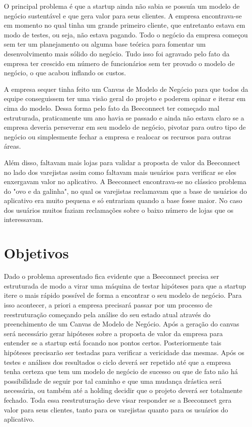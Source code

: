 O principal problema é que a startup ainda não sabia se possuía um modelo de negócio sustentável e que gera valor para seus clientes. A empresa encontrava-se em momento no qual tinha um grande primeiro cliente, que entretanto estava em modo de testes, ou seja, não estava pagando.
Todo o negócio da empresa começou sem ter um planejamento ou alguma base teórica para fomentar um desenvolvimento mais sólido do negócio. Tudo isso foi agravado pelo fato da empresa ter crescido em número de funcionários sem ter provado o modelo de negócio, o que acabou inflando os custos.

A empresa sequer tinha feito um Canvas de Modelo de Negócio para que todos da equipe conseguissem ter uma visão geral do projeto e poderem opinar e iterar em cima do modelo. Dessa forma pelo fato da Beeconnect ter começado mal estruturada, praticamente um ano havia se passado e ainda não estava claro se a empresa deveria perseverar em seu modelo de negócio, pivotar para outro tipo de negócio ou simplesmente fechar a empresa e realocar os recursos para outras áreas.

Além disso, faltavam mais lojas para validar a proposta de valor da Beeconnect no lado dos varejistas assim como faltavam mais usuários para verificar se eles enxergavam valor no aplicativo. A Beeconnect encontrava-se no clássico problema do "ovo e da galinha", no qual os varejistas reclamavam que a base de usuários do aplicativo era muito pequena e só entrariam quando a base fosse maior. No caso dos usuários muitos faziam reclamações sobre o baixo número de lojas que os interessavam.

\section[Objetivos]{Objetivos}
\label{chap:objetivos}
Dado o problema apresentado fica evidente que a Beeconnect precisa ser estruturada de modo a virar uma máquina de testar hipóteses para que a startup itere o mais rápido possível de forma a encontrar o seu modelo de negócio. Para isso acontecer, a priori a empresa precisará passar por um processo de reestruturação começando pela análise do seu estado atual através do preenchimento de um Canvas de Modelo de Negócio. Após a geração do canvas será necessário gerar hipóteses sobre a proposta de valor da empresa para entender se a startup está focando nos pontos certos. Posteriormente tais hipóteses precisarão ser testadas para verificar a vericidade das mesmas. Após os testes e análises dos resultados o ciclo deverá ser repetido até que a empresa tenha certeza que tem um modelo de negócio de sucesso ou que de fato não há possibilidade de seguir por tal caminho e que uma mudança drástica será necessária, ou também até a holding decidir que o projeto deverá ser totalmente fechado.
Toda essa reestruturação deve visar responder se a Beeconnect gera valor para seus clientes, tanto para os varejistas quanto para os usuários do aplicativo. 

